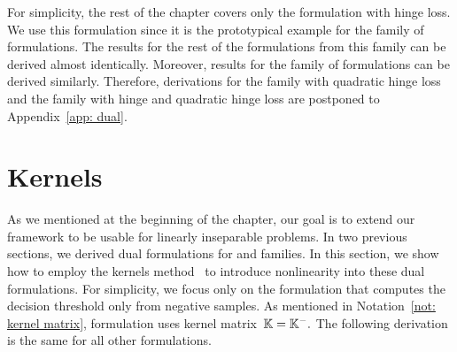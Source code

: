 \begin{note}
  For simplicity, the rest of the chapter covers only the \TopPushK formulation with hinge loss. We use this formulation since it is the prototypical example for the \TopPushK family of formulations. The results for the rest of the formulations from this family can be derived almost identically. Moreover, results for the \PatMat family of formulations can be derived similarly. Therefore, derivations for the \TopPushK family with quadratic hinge loss and the \PatMat family with hinge and quadratic hinge loss are postponed to Appendix~\ref{app: dual}.
\end{note}

\pagebreak

\section{Kernels}\label{sec: kernels}

As we mentioned at the beginning of the chapter, our goal is to extend our framework to be usable for linearly inseparable problems. In two previous sections, we derived dual formulations for \TopPushK and \PatMat families. In this section, we show how to employ the kernels method~\cite{scholkopf2001learning} to introduce nonlinearity into these dual formulations. For simplicity, we focus only on the \TopPushK formulation that computes the decision threshold only from negative samples. As mentioned in Notation~\ref{not: kernel matrix}, \TopPushK formulation uses kernel matrix~$\mathbb{K} = \mathbb{K}^{-}.$ The following derivation is the same for all other formulations.

